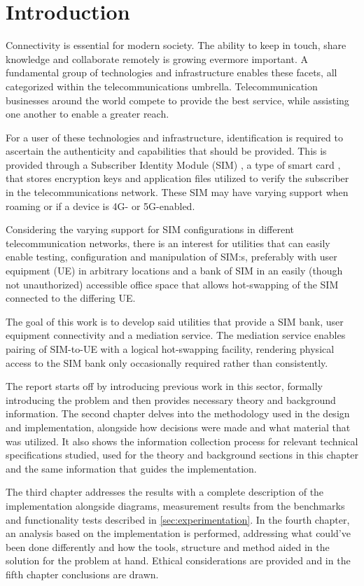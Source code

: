 \chapter{Introduction}

Connectivity is essential for modern society. The ability to keep in
touch, share knowledge and collaborate remotely is growing evermore
important. A fundamental group of technologies and infrastructure
enables these facets, all categorized within the telecommunications
umbrella. Telecommunication businesses around the world compete to
provide the best service, while assisting one another to enable a
greater reach.

For a user of these technologies and infrastructure, identification
is required to ascertain the authenticity and capabilities that
should be provided. This is provided through a Subscriber Identity
Module (SIM) \cite{etsi-ts-131-102}, a type of smart card \cite{etsi-ts-102-221},
that stores encryption keys and application files utilized to verify
the subscriber in the telecommunications network. These SIM may have
varying support when roaming or if a device is 4G- or 5G-enabled.

Considering the varying support for SIM configurations in different
telecommunication networks, there is an interest for utilities that
can easily enable testing, configuration and manipulation of SIM:s,
preferably with user equipment (UE) in arbitrary locations and a bank
of SIM in an easily (though not unauthorized) accessible office space
that allows hot-swapping of the SIM connected to the differing UE.

The goal of this work is to develop said utilities that provide a
SIM bank, user equipment connectivity and a mediation service. The
mediation service enables pairing of SIM-to-UE with a logical
hot-swapping facility, rendering physical access to the SIM bank
only occasionally required rather than consistently.

The report starts off by introducing previous work in this sector,
formally introducing the problem and then provides necessary theory
and background information. The second chapter delves into the
methodology used in the design and implementation, alongside how
decisions were made and what material that was utilized. It also
shows the information collection process for relevant technical
specifications studied, used for the theory and background sections
in this chapter and the same information that guides the
implementation.

The third chapter addresses the results with a complete description
of the implementation alongside diagrams, measurement results from
the benchmarks and functionality tests described in \ref{sec:experimentation}.
In the fourth chapter, an analysis based on the implementation is
performed, addressing what could've been done differently and how
the tools, structure and method aided in the solution for the
problem at hand. Ethical considerations are provided and in the
fifth chapter conclusions are drawn.

